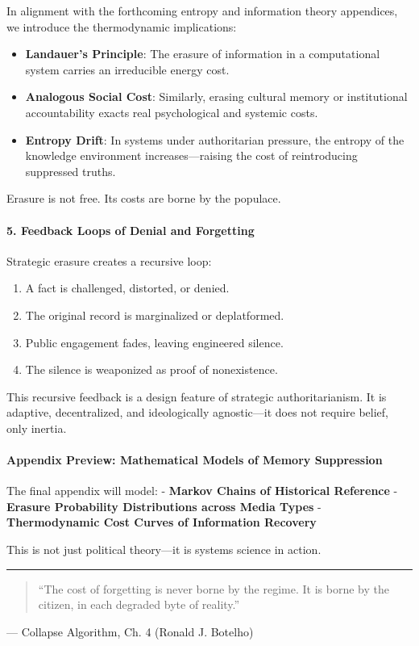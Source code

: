 In alignment with the forthcoming entropy and information theory
appendices, we introduce the thermodynamic implications:

\begin{itemize}
\tightlist
\item
  \textbf{Landauer's Principle}: The erasure of information in a
  computational system carries an irreducible energy cost.
\item
  \textbf{Analogous Social Cost}: Similarly, erasing cultural memory or
  institutional accountability exacts real psychological and systemic
  costs.
\item
  \textbf{Entropy Drift}: In systems under authoritarian pressure, the
  entropy of the knowledge environment increases---raising the cost of
  reintroducing suppressed truths.
\end{itemize}

Erasure is not free. Its costs are borne by the populace.

\paragraph{5. Feedback Loops of Denial and
Forgetting}\label{feedback-loops-of-denial-and-forgetting}

Strategic erasure creates a recursive loop:

\begin{enumerate}
\def\labelenumi{\arabic{enumi}.}
\tightlist
\item
  A fact is challenged, distorted, or denied.
\item
  The original record is marginalized or deplatformed.
\item
  Public engagement fades, leaving engineered silence.
\item
  The silence is weaponized as proof of nonexistence.
\end{enumerate}

This recursive feedback is a design feature of strategic
authoritarianism. It is adaptive, decentralized, and ideologically
agnostic---it does not require belief, only inertia.

\paragraph{Appendix Preview: Mathematical Models of Memory
Suppression}\label{appendix-preview-mathematical-models-of-memory-suppression}

The final appendix will model: - \textbf{Markov Chains of Historical
Reference} - \textbf{Erasure Probability Distributions across Media
Types} - \textbf{Thermodynamic Cost Curves of Information Recovery}

This is not just political theory---it is systems science in action.

\begin{center}\rule{0.5\linewidth}{0.5pt}\end{center}

\begin{quote}
``The cost of forgetting is never borne by the regime. It is borne by
the citizen, in each degraded byte of reality.''
\end{quote}

--- Collapse Algorithm, Ch. 4 (Ronald J. Botelho)
